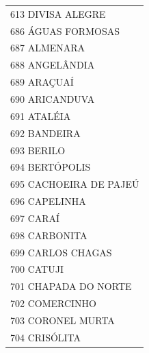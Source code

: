 \documentclass{article}
\begin{document}
\begin{longtable}[c]{m{18cm}}
\multicolumn{1}{l}{ \hspace{2em} 613 DIVISA ALEGRE } \\
\multicolumn{1}{l}{ \hspace{2em} 686 ÁGUAS FORMOSAS } \\
\multicolumn{1}{l}{ \hspace{2em} 687 ALMENARA } \\
\multicolumn{1}{l}{ \hspace{2em} 688 ANGELÂNDIA } \\
\multicolumn{1}{l}{ \hspace{2em} 689 ARAÇUAÍ } \\
\multicolumn{1}{l}{ \hspace{2em} 690 ARICANDUVA } \\
\multicolumn{1}{l}{ \hspace{2em} 691 ATALÉIA } \\
\multicolumn{1}{l}{ \hspace{2em} 692 BANDEIRA } \\
\multicolumn{1}{l}{ \hspace{2em} 693 BERILO } \\
\multicolumn{1}{l}{ \hspace{2em} 694 BERTÓPOLIS } \\
\multicolumn{1}{l}{ \hspace{2em} 695 CACHOEIRA DE PAJEÚ } \\
\multicolumn{1}{l}{ \hspace{2em} 696 CAPELINHA } \\
\multicolumn{1}{l}{ \hspace{2em} 697 CARAÍ } \\
\multicolumn{1}{l}{ \hspace{2em} 698 CARBONITA } \\
\multicolumn{1}{l}{ \hspace{2em} 699 CARLOS CHAGAS } \\
\multicolumn{1}{l}{ \hspace{2em} 700 CATUJI } \\
\multicolumn{1}{l}{ \hspace{2em} 701 CHAPADA DO NORTE } \\
\multicolumn{1}{l}{ \hspace{2em} 702 COMERCINHO } \\
\multicolumn{1}{l}{ \hspace{2em} 703 CORONEL MURTA } \\
\multicolumn{1}{l}{ \hspace{2em} 704 CRISÓLITA } \\

\end{longtable}
\end{document}
